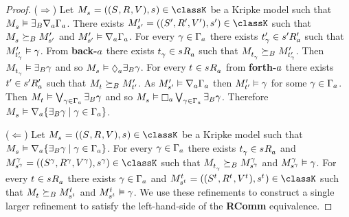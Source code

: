 \begin{proof}
($\Rightarrow$) Let $\kPModelAndTuple{\kStateS} \in \classK$ be a Kripke model such that $\kPModel{\kStateS} \entails \somerefsBs \coversA \Gamma_\agentA$.
There exists $\kPModelAndTupleP{\kStateSP} \in \classK$ such that $\kPModel{\kStateS} \simulatesBs \kPModelP{\kStateSP}$ and $\kPModelP{\kStateSP} \entails \coversA \Gamma_\agentA$.
For every $\gamma \in \Gamma_\agentA$ there exists $\kStateTP_\gamma \in \kSuccessorsPA{\kStateSP}$ such that $\kPModelP{\kStateTP_\gamma} \entails \gamma$.
From {\bf back-$\agentA$} there exists $\kStateT_\gamma \in \kSuccessorsA{\kStateS}$ such that $\kPModel{\kStateT_\gamma} \simulatesBs \kPModelP{\kStateTP_\gamma}$.
Then $\kPModel{\kStateT_\gamma} \entails \somerefsBs \gamma$ and so $\kPModel{\kStateS} \entails \possibleA \somerefsBs \gamma$.
For every $\kStateT \in \kSuccessorsA{\kStateS}$ from {\bf forth-$\agentA$} there exists $\kStateTP \in \kSuccessorsPA{\kStateSP}$ such that $\kPModel{\kStateT} \simulatesBs \kPModelP{\kStateTP}$.
As $\kPModelP{\kStateSP} \entails \coversA \Gamma_\agentA$ then $\kPModelP{\kStateTP} \entails \gamma$ for some $\gamma \in \Gamma_\agentA$.
Then $\kPModel{\kStateT} \entails \bigvee_{\gamma \in \Gamma_\agentA} \somerefsBs \gamma$ and so $\kPModel{\kStateS} \entails \necessaryA \bigvee_{\gamma \in \Gamma_\agentA} \somerefsBs \gamma$.
Therefore $\kPModel{\kStateS} \entails \coversA \{\somerefsBs \gamma \mid \gamma \in \Gamma_\agentA\}$.

($\Leftarrow$) Let $\kPModelAndTuple{\kStateS} \in \classK$ be a Kripke model such that $\kPModel{\kStateS} \entails \coversA \{\somerefsBs \gamma \mid \gamma \in \Gamma_\agentA\}$.
For every $\gamma \in \Gamma_\agentA$ there exists $\kStateT_\gamma \in \kSuccessorsA{\kStateS}$ and $\kPModelAndTuple[\gamma]{\kStateS[\gamma]} \in \classK$ such that $\kPModel{\kStateT_\gamma} \simulatesBs \kPModel[\gamma]{\kStateS[\gamma]}$ and $\kPModel[\gamma]{\kStateS[\gamma]} \entails \gamma$.
For every $\kStateT \in \kSuccessorsA{\kStateS}$ there exists $\gamma \in \Gamma_\agentA$ and $\kPModelAndTuple[\kStateT]{\kStateS[\kStateT]} \in \classK$ such that $\kPModel{\kStateT} \simulatesBs \kPModel[\kStateT]{\kStateS[\kStateT]}$ and $\kPModel[\kStateT]{\kStateS[\kStateT]} \entails \gamma$.
We use these refinements to construct a single larger refinement to satisfy the left-hand-side of the {\bf RComm} equivalence.


\end{proof}
